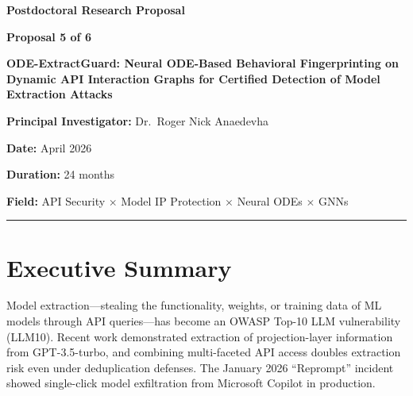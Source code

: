 \documentclass[12pt,a4paper]{article}
\begin{document}
\begin{center}
{\LARGE \textbf{Postdoctoral Research Proposal}}

\vspace{0.5cm}

{\Large \textbf{Proposal 5 of 6}}

\vspace{1cm}

{\huge \textbf{ODE-ExtractGuard: Neural ODE-Based Behavioral Fingerprinting on Dynamic API Interaction Graphs for Certified Detection of Model Extraction Attacks}}

\vspace{1cm}

{\large \textbf{Principal Investigator:} Dr.\ Roger Nick Anaedevha}

\vspace{0.3cm}

{\large \textbf{Date:} April 2026}

\vspace{0.3cm}

{\large \textbf{Duration:} 24 months}

\vspace{0.3cm}

{\large \textbf{Field:} API Security $\times$ Model IP Protection $\times$ Neural ODEs $\times$ GNNs}

\end{center}

\vspace{1cm}
\hrule
\vspace{0.5cm}

\tableofcontents

\newpage

\section{Executive Summary}

Model extraction---stealing the functionality, weights, or training data of ML models through API queries---has become an OWASP Top-10 LLM vulnerability (LLM10). Recent work demonstrated extraction of projection-layer information from GPT-3.5-turbo, and combining multi-faceted API access doubles extraction risk even under deduplication defenses. The January 2026 ``Reprompt'' incident showed single-click model exfiltration from Microsoft Copilot in production.
\end{document}
